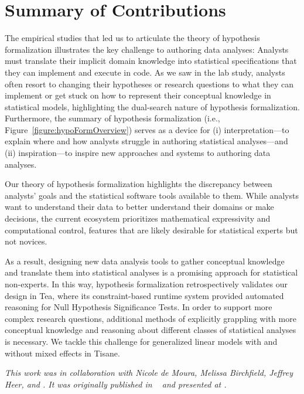 

\section{Summary of Contributions}


The empirical studies that led us to articulate the theory of hypothesis
formalization illustrates the key challenge to authoring data analyses: Analysts
must translate their implicit domain knowledge into statistical specifications
that they can implement and execute in code. As we saw in the lab study,
analysts often resort to changing their hypotheses or research questions to what
they can implement or get stuck on how to represent their conceptual knowledge
in statistical models, highlighting the dual-search nature of hypothesis
formalization. Furthermore, the summary of hypothesis formalization (i.e.,
Figure~\ref{figure:hypoFormOverview}) serves as a device for (i) interpretation---to
explain where and how analysts struggle in authoring statistical analyses---and
(ii) inspiration---to inspire new approaches and systems to authoring data
analyses. 

Our theory of hypothesis formalization highlights the discrepancy between
analysts' goals and the statistical software tools available to them. While
analysts want to understand their data to better understand their domains or
make decisions, the current ecosystem prioritizes mathematical expressivity and
computational control, features that are likely desirable for statistical
experts but not novices. 

As a result, designing new data analysis tools to gather conceptual knowledge
and translate them into statistical analyses is a promising approach for
statistical non-experts. In this way, hypothesis formalization retrospectively
validates our design in Tea, where its constraint-based runtime system provided
automated reasoning for Null Hypothesis Significance Tests. In order to support
more complex research questions, additional methods of explicitly grappling with
more conceptual knowledge and reasoning about different classes of statistical
analyses is necessary. We tackle this challenge for generalized linear models
with and without mixed effects in Tisane. 

\textit{This work was in collaboration with Nicole de Moura, Melissa Birchfield, Jeffrey
Heer, and \reneJust. It was originally published in ~\cite{jun2022hypoForm} and presented
at .}